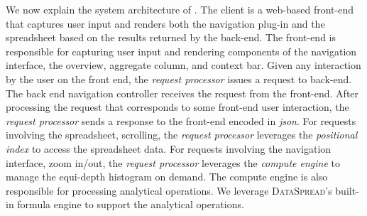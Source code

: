 We now explain the system architecture of \noah. 
The \noah client is a web-based front-end that captures user input and renders both the navigation plug-in and the spreadsheet 
based on the results returned by the back-end. 
The front-end is responsible for capturing user input and rendering components of the navigation interface, \ie the overview, aggregate column, and context bar. 
Given any interaction by the user on the front end, 
the \emph{request processor} issues a request to back-end.
The back end navigation controller receives the request from the front-end. 
After processing the request that corresponds to some front-end user interaction, 
the \emph{request processor} sends a response to the front-end encoded in \emph{json}. 
For requests involving the spreadsheet, \eg scrolling, 
the \emph{request processor} leverages the \emph{positional index} 
to access the spreadsheet data. 
For requests involving the navigation interface, \eg zoom in/out, 
the \emph{request processor} leverages the \emph{compute engine} to manage the equi-depth histogram on demand. 
The compute engine is also responsible for processing analytical operations. We leverage {\scshape DataSpread}’s built-in formula engine to support the analytical operations.


